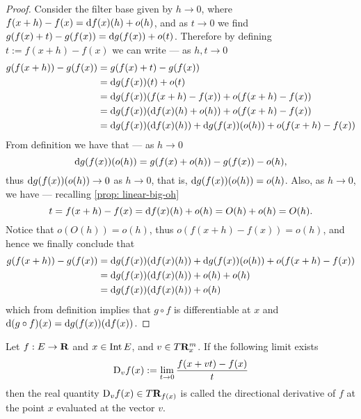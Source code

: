 \begin{proof}
  Consider the filter base given by \(h \to 0\), where \(f(x + h) - f(x) = \mathrm{d}
  f(x)(h) + o(h)\), and as \(t \to 0\) we find \(g(f(x) + t) - g(f(x)) = \mathrm{d}
  g(f(x)) + o(t)\). Therefore by defining \(t := f(x + h) - f(x)\) we can write ---
  as \(h, t \to 0\)
  \begin{align*}
    g(f(x + h)) - g(f(x)) &= g(f(x) + t) - g(f(x)) \\
                          &= \mathrm{d} g(f(x))(t) + o(t) \\
                          &= \mathrm{d} g(f(x))(f(x + h) - f(x)) + o(f(x + h) - f(x))
                          \\
                          &= \mathrm{d} g(f(x))(\mathrm{d} f(x)(h) + o(h)) + o(f(x + h) -
                          f(x))
                          \\
                          &= \mathrm{d} g(f(x))(\mathrm{d} f(x)(h)) + \mathrm{d} g(f(x))(o(h))
                          + o(f(x + h) - f(x))
  \end{align*}
  From definition we have that --- as \(h \to 0\)
  \[
    \mathrm{d} g(f(x))(o(h)) = g(f(x) + o(h)) - g(f(x)) - o(h),
  \]
  thus \(\mathrm{d} g(f(x))(o(h)) \to 0\) as \(h \to 0\), that is, \(\mathrm{d} g(f(x))
  (o(h)) = o(h)\). Also, as \(h \to 0\), we have --- recalling \cref{prop:
  linear-big-oh}
  \[
    t = f(x + h) - f(x) = \mathrm{d} f(x)(h) + o(h) = O(h) + o(h) = O(h).
  \]
  Notice that \(o(O(h)) = o(h)\), thus \(o(f(x + h) - f(x)) = o(h)\), and hence
  we finally conclude that
  \begin{align*}
    g(f(x + h)) - g(f(x))
    &= \mathrm{d} g(f(x))(\mathrm{d} f(x)(h)) + \mathrm{d} g(f(x))(o(h)) + o(f(x + h) - f(x))\\
    &= \mathrm{d} g(f(x))(\mathrm{d} f(x)(h)) + o(h) + o(h)\\
    &= \mathrm{d} g(f(x))(\mathrm{d} f(x)(h)) + o(h)
  \end{align*}
  which from definition implies that \(g \circ f\) is differentiable at \(x\)
  and \(\mathrm{d} (g \circ f)(x) = \mathrm{d} g(f(x))(\mathrm{d} f(x))\).
\end{proof}

\begin{definition}\label{def: dir-derivative}
  Let \(f: E \to \mathbf{R}\) and \(x \in  \operatorname{Int} E\), and \(v \in T\mathbf{R}^m_x\). If the
  following limit exists
  \begin{equation}
    \mathrm{D}_v f(x) := \lim_{t \to 0} \frac{f(x + v t) - f(x)}{t}
  \end{equation}
  then the real quantity \(\mathrm{D}_v f(x) \in T\mathbf{R}_{f(x)}\) is called the
  directional derivative of \(f\) at the point \(x\) evaluated at the vector
  \(v\).
\end{definition}

